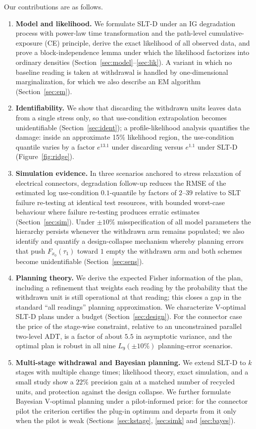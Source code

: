 \documentclass[11pt]{article}
\newcommand{\SLTD}{SLT-D}
\begin{document}
Our contributions are as follows.
\begin{enumerate}
\item \textbf{Model and likelihood.} We formulate \SLTD{} under an IG degradation process with
power-law time transformation and the path-level cumulative-exposure (CE) principle, derive the
exact likelihood of all observed data, and prove a block-independence lemma under which the
likelihood factorizes into ordinary densities (Section~\ref{sec:model}--\ref{sec:lik}). A
variant in which no baseline reading is taken at withdrawal is handled by one-dimensional
marginalization, for which we also describe an EM algorithm (Section~\ref{sec:em}).
\item \textbf{Identifiability.} We show that discarding the withdrawn units leaves data from a
single stress only, so that use-condition extrapolation becomes unidentifiable
(Section~\ref{sec:ident}); a profile-likelihood analysis quantifies the damage: inside an
approximate 15\% likelihood region, the use-condition quantile varies by a factor
$e^{13.1}$ under discarding versus $e^{1.1}$ under \SLTD{} (Figure~\ref{fig:ridge}).
\item \textbf{Simulation evidence.} In three scenarios anchored to stress relaxation of
electrical connectors, degradation follow-up reduces the RMSE of the estimated
log use-condition $0.1$-quantile by factors of $2$--$39$ relative to SLT failure re-testing at
identical test resources, with bounded worst-case behaviour where failure re-testing produces
erratic estimates (Section~\ref{sec:sim}). Under $\pm10\%$ misspecification of all model
parameters the hierarchy persists whenever the withdrawn arm remains populated; we also
identify and quantify a design-collapse mechanism whereby planning errors that push
$F_{x_0}(\tau_1)$ toward $1$ empty the withdrawn arm and both schemes become unidentifiable
(Section~\ref{sec:sens}).
\item \textbf{Planning theory.} We derive the expected Fisher information of the plan,
including a refinement that weights each reading by the probability that the withdrawn unit is
still operational at that reading; this closes a gap in the standard ``all readings'' planning
approximation. We characterize V-optimal \SLTD{} plans under a budget
(Section~\ref{sec:design}). For the connector case the price of the stage-wise constraint,
relative to an unconstrained parallel two-level ADT, is a factor of about $5.5$ in asymptotic
variance, and the optimal plan is robust in all nine $L_9(\pm10\%)$ planning-error
scenarios.
\item \textbf{Multi-stage withdrawal and Bayesian planning.} We extend \SLTD{} to $k$ stages
with multiple change times; likelihood theory, exact simulation, and a small study show a
$22\%$ precision gain at a matched number of recycled units, and protection against the
design collapse. We further formulate Bayesian V-optimal planning under a pilot-informed
prior: for the connector pilot the criterion certifies the plug-in optimum and departs from it
only when the pilot is weak (Sections~\ref{sec:kstage}, \ref{sec:simk} and \ref{sec:bayes}).
\end{enumerate}
\end{document}
